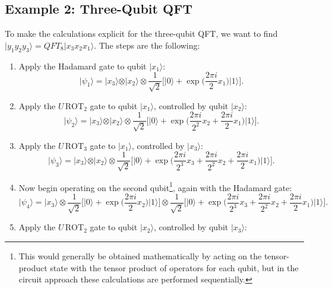 \documentclass[a4paper]{article}
\begin{document}
\subsection{Example 2: Three-Qubit QFT}
To make the calculations explicit for the three-qubit QFT, we want to find $\vert y_1 y_2 y_3\rangle=QFT_8\vert x_3 x_2 x_1\rangle$. The steps are the following:
\begin{enumerate}
\item Apply the Hadamard gate to qubit $\vert x_1 \rangle$:
\begin{equation}
\vert \psi_1\rangle=\vert x_3\rangle\otimes \vert x_2\rangle\otimes\frac{1}{\sqrt{2}}\bigg[ \vert 0\rangle + \exp{\bigg(\frac{2\pi i}{2} x_1\bigg)}\vert 1\rangle\bigg].
\end{equation}
\item Apply the $U\,\text{ROT}_2$ gate to qubit $\vert x_1\rangle$, controlled by qubit $\vert x_2\rangle$:
\begin{equation}
\vert \psi_2\rangle=\vert x_3\rangle\otimes \vert x_2\rangle\otimes\frac{1}{\sqrt{2}}\bigg[ \vert 0\rangle + \exp{\bigg(\frac{2\pi i}{2^2} x_2+\frac{2\pi i}{2} x_1\bigg)}\vert 1\rangle\bigg].
\end{equation}
\item Apply the $U\,\text{ROT}_3$ gate to $\vert x_1\rangle$, controlled by $\vert x_3\rangle$:
\begin{equation}
\vert \psi_3\rangle=\vert x_3\rangle\otimes \vert x_2\rangle\otimes\frac{1}{\sqrt{2}}\bigg[ \vert 0\rangle + \exp{\bigg(\frac{2\pi i}{2^3} x_3 +\frac{2\pi i}{2^2} x_2+\frac{2\pi i}{2} x_1\bigg)}\vert 1\rangle\bigg].
\end{equation}
\item Now begin operating on the second qubit\footnote{This would generally be obtained mathematically by acting on the tensor-product state with the tensor product of operators for each qubit, but in the circuit approach these calculations are performed sequentially.}, again with the Hadamard gate:
\begin{equation}
\vert \psi_4\rangle=\vert x_3\rangle \otimes \frac{1}{\sqrt{2}}\bigg[ \vert 0\rangle + \exp{\bigg( \frac{2\pi i}{2} x_2 \bigg)}\vert 1\rangle\bigg] \otimes  \frac{1}{\sqrt{2}}\bigg[ \vert 0\rangle + \exp{\bigg(\frac{2\pi i}{2^3} x_3 +\frac{2\pi i}{2^2} x_2+\frac{2\pi i}{2} x_1\bigg)}\vert 1\rangle\bigg].
\end{equation}
\item Apply the $U\,\text{ROT}_2$ gate to qubit $\vert x_2\rangle$, controlled by qubit $\vert x_3\rangle$:

\end{enumerate}
\end{document}
